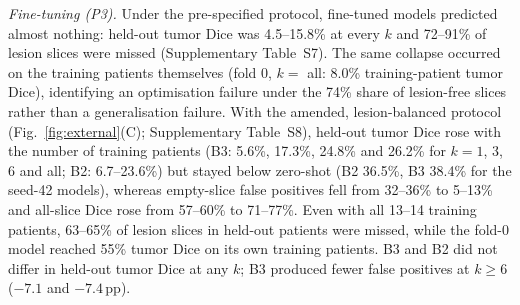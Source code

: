 \documentclass[journal]{IEEEtran}
\begin{document}
\textit{Fine-tuning (P3).} Under the pre-specified protocol, fine-tuned models predicted almost nothing: held-out tumor Dice was 4.5--15.8\% at every $k$ and 72--91\% of lesion slices were missed (Supplementary Table~S7). The same collapse occurred on the training patients themselves (fold 0, $k=$ all: 8.0\% training-patient tumor Dice), identifying an optimisation failure under the 74\% share of lesion-free slices rather than a generalisation failure. With the amended, lesion-balanced protocol (Fig.~\ref{fig:external}(C); Supplementary Table~S8), held-out tumor Dice rose with the number of training patients (B3: 5.6\%, 17.3\%, 24.8\% and 26.2\% for $k=1$, 3, 6 and all; B2: 6.7--23.6\%) but stayed below zero-shot (B2 36.5\%, B3 38.4\% for the seed-42 models), whereas empty-slice false positives fell from 32--36\% to 5--13\% and all-slice Dice rose from 57--60\% to 71--77\%. Even with all 13--14 training patients, 63--65\% of lesion slices in held-out patients were missed, while the fold-0 model reached 55\% tumor Dice on its own training patients. B3 and B2 did not differ in held-out tumor Dice at any $k$; B3 produced fewer false positives at $k\ge6$ ($-7.1$ and $-7.4$\,pp).
\end{document}
